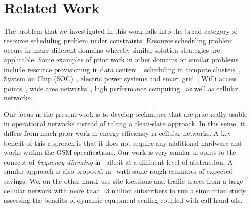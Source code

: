 \section{Related Work}
\label{sec:related} 
The problem that we investigated in this work falls into the broad category of resource scheduling problem under constraints. Resource scheduling problem occurs in many different domains whereby similar solution strategies are applicable. Some examples of prior work in other domains on similar problems include resource provisioning in data centers~\cite{Jeyarani:2012:DIA:2148243.2148374,serverEnergy,Mazzucco:Maximizing:2011:CoRR,Oh:2011:ECS:2170444.2170458,Chase:2001:MES:502059.502045}, scheduling in compute clusters~\cite{AlDaoud2012745}, System on Chip (SOC)~\cite{Fang:2011:COP:1995896.1995940}, electric power systems and smart grid~\cite{Javed:2008:ULP:1485753.1485792,Logenthiran2011138,Celli:2001:PICA,FahadJavedAdOpt.SASO.2009.26}, WiFi access points~\cite{Marsan:2010:SAM:1791314.1791340}, wide area networks~\cite{Cavdar:2011:ECOC}, high performance computing~\cite{Lee:ServerConsolidation:2011:Globecom,Pinheiro01loadbalancing,Yao:DCPowerReduction:2012:INFOCOM,Herodotou:Starfish:2011:CIDR,Herodotou:2011:NOS:2038916.2038934,Aikema:ElecCostHPC:2011:ISSST} as well as cellular networks~\cite{Peng:2011:TPS:2030613.2030628,Peng:2011:BTSSaving:Mobicom}.

Our focus in the present work is to develop techniques that are practically usable in operational networks instead of taking a clean-slate approach. In this sense, it differs from much prior work in energy efficiency in cellular networks. A key benefit of this approach is that it 
does not require any additional hardware
and works within the GSM specifications. Our
work is very similar in spirit to the concept of
\textit{frequency dimming}
in~\cite{Tipper:Dimming:Globecom:2010} albeit at a different
level of abstraction. A similar approach is also proposed
in~\cite{Blume:2010:BLTJ:CellularPower} with some rough
estimates of expected savings. We, on the other hand, use site
locations and traffic traces from a large cellular network with
more than 13 million subscribers to run a simulation study
assessing the benefits of dynamic equipment scaling coupled
with call hand-offs. 